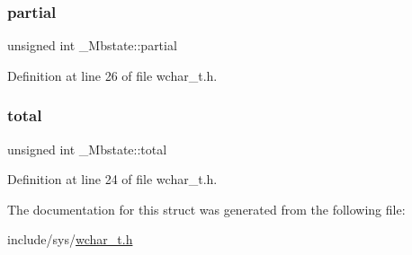 \subsubsection{\texorpdfstring{partial}{partial}}
{\footnotesize\ttfamily unsigned int \+\_\+\+Mbstate\+::partial}



Definition at line 26 of file wchar\+\_\+t.\+h.

\mbox{\label{struct__Mbstate_a15deae3c0de3461b42f32f9ab8a692aa}} 
\subsubsection{\texorpdfstring{total}{total}}
{\footnotesize\ttfamily unsigned int \+\_\+\+Mbstate\+::total}



Definition at line 24 of file wchar\+\_\+t.\+h.



The documentation for this struct was generated from the following file\+:\begin{DoxyCompactItemize}
\item 
include/sys/\mbox{\hyperlink{wchar__t_8h}{wchar\+\_\+t.\+h}}\end{DoxyCompactItemize}
